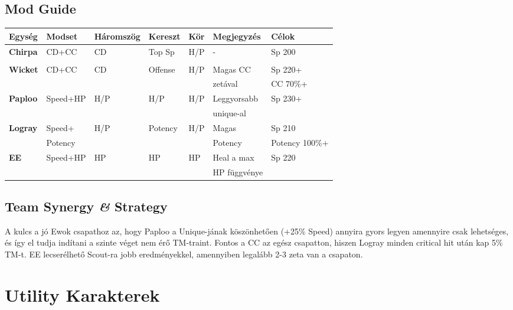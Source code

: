 \documentclass[11pt]{report}
\begin{document}
\section{Mod Guide}
\begin{center}
    \begin{tabular}{|l | l | l | l | l | l | l |}
        \hline
        Egység & Modset & Háromszög & Kereszt & Kör & Megjegyzés & Célok\\ \hline
        \textbf{Chirpa} & CD+CC & CD & Top Sp & H/P & - & Sp 200\\
        &  &  &  &  &  & \\ \hline
        \textbf{Wicket} & CD+CC & CD & Offense & H/P & Magas CC & Sp 220+\\
        &  &  &  &  & zetával & CC 70\%+\\ \hline
        \textbf{Paploo} & Speed+HP & H/P & H/P & H/P & Leggyorsabb & Sp 230+\\
        &  &  &  &  & unique-al & \\ \hline
        \textbf{Logray} & Speed+ & H/P & Potency & H/P & Magas & Sp 210\\
        & Potency &  &  &  & Potency & Potency 100\%+\\ \hline
        \textbf{EE} & Speed+HP & HP & HP & HP & Heal a max & Sp 220\\
        &  &  &  &  & HP függvénye & \\ \hline
    \end{tabular}
\end{center}
\section{Team Synergy \textit{\&} Strategy}
A kulcs a jó Ewok csapathoz az, hogy Paploo a Unique-jának köszönhetően (+25\% Speed) annyira gyors legyen amennyire csak lehetséges, és így el tudja indítani a szinte véget nem érő TM-traint. Fontos a CC az egész csapatton, hiszen Logray minden critical hit után kap 5\% TM-t. EE lecserélhető Scout-ra jobb eredményekkel, amennyiben legalább 2-3 zeta van a csapaton.


\chapter{Utility Karakterek}
\end{document}
